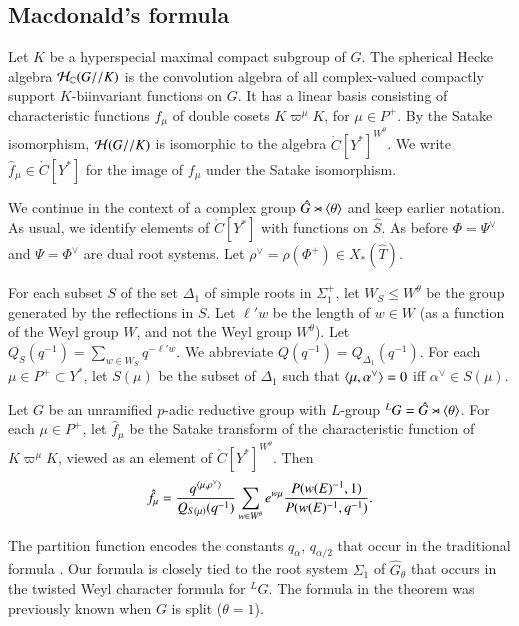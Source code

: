 \subsection{Macdonald's formula}\label{sec:macdonald}

Let $K$ be a hyperspecial maximal compact subgroup of $G$.  The
spherical Hecke algebra $\mathcal H_{\mathbb{C}}(G//K)$ is the convolution
algebra of all complex-valued compactly support $K$-biinvariant
functions on $G$.  It has a linear basis consisting of characteristic
functions $f_\mu$ of double cosets $K\varpi^\mu K$, for $\mu\in P^+$.
By the Satake isomorphism, $\mathcal H(G//K)$ is isomorphic to the algebra
$\ring{C}[Y^*]^{W^\theta}$.  We write $\hat f_\mu\in \ring{C}[Y^*]$
for the image of $f_\mu$ under the Satake isomorphism.

We continue in the context of a complex group $\hat G \rtimes
\langle{\theta}\rangle$ and keep earlier notation.  As usual, we identify
elements of $\ring{C}[Y^*]$ with functions on $\hat S$.  As before
$\Phi=\Psi^\vee$ and $\Psi = \Phi^\vee$ are dual root systems.  Let
$\rho^\vee = \rho(\Phi^+)\in X_*(\hat T)$.

For each subset $S$ of the set $\Delta_1$ of simple roots in
$\Sigma^+_1$, let $W_S\le W^\theta$ be the group generated by the
reflections in $S$.  Let $\ell' w$ be the length of $w\in W$ (as a
function of the Weyl group $W$, and not the Weyl group $W^\theta$).
Let $Q_S(q^{-1}) = \sum_{w\in W_S} q^{-\ell'w}$.  We abbreviate
$Q(q^{-1}) = Q_{\Delta_1}(q^{-1})$.  For each $\mu\in P^+\subset Y^*$,
let $S(\mu)$ be the subset of $\Delta_1$ such that
$\langle{\mu,\alpha^\vee}\rangle=0$ iff $\alpha^\vee\in S(\mu)$.

\begin{theorem}\label{thm:macdonald}
  Let $G$ be an unramified $p$-adic reductive group with $L$-group
  ${}^LG = \hat G \rtimes \langle{\theta}\rangle$.  For each $\mu\in P^+$, let
  $\hat f_\mu$ be the Satake transform of the characteristic function
  of $K\varpi^\mu K$, viewed as an element of
  $\ring{C}[Y^*]^{W^\theta}$.  Then
\[
\hat f_\mu = \frac{q^{\langle{\mu,\rho^\vee}\rangle}}{ Q_{S(\mu)}(q^{-1})} 
\sum_{w\in W^\theta} e^{w\mu} \frac{P(w(E)^{-1},1)}{P(w(E)^{-1},q^{-1})}.
\]
\end{theorem}

The partition function encodes the constants $q_\alpha$,
$q_{\alpha/2}$ that occur in the traditional formula
\cite{macdonaldspherical}.  Our formula is closely tied to the root
system $\Sigma_1$ of $\hat G_\theta$ that occurs in the twisted Weyl
character formula for ${}^LG$.  The formula in the theorem was
previously known when $G$ is split ($\theta=1$).

